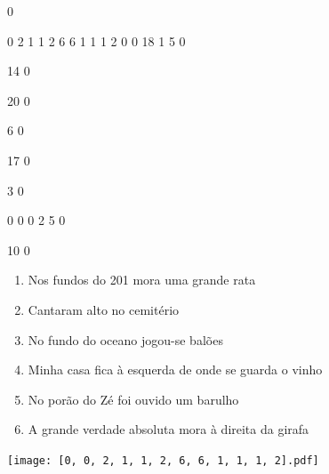 \documentclass[12pt]{article}
\begin{document}
		\vfill  
		  
{
	0	%

	0	%
	2	%
	1	%
	1	%
	2	%
	6	%
	6	%
	1	%
	1	%
	1	%
	2	%
	0	%
	0	%
	18	%
	1	%
	5	%
	0	%

	14	%
	0	%

	20	%
	0	%

	6	%
	0	%

	17	%
	0	%

	3	%
	0	%

	0	%
	0	%
	0	%
	2	%
	5	%
	0	%

	10	%
	0	%

}	  
		    	

		 

\pagebreak


	\begin{enumerate}
		  \sffamily %
		  \large %


\vfill \item
Nos fundos do 201	%
mora uma grande rata	%

\vfill \item
Cantaram alto	%
no cemitério	%

\vfill \item
No fundo do oceano	%
jogou-se balões	%

\vfill \item
Minha casa fica	%
à esquerda
de onde se guarda o vinho	%

\vfill \item
No porão do Zé	%
foi ouvido um barulho	%

\vfill \item
A grande verdade absoluta mora	%
à direita
da girafa	%
	\end{enumerate}
		  
		  \hfill

		  \vfill

\texttt{[image: [0, 0, 2, 1, 1, 2, 6, 6, 1, 1, 1, 2].pdf]}


	\hfill	  	  

\end{document}
